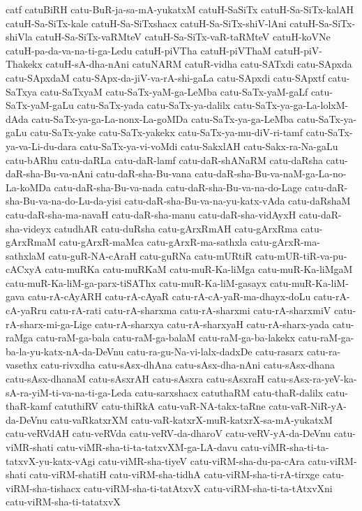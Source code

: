 {catf
catuBiRH
catu-BuR-ja-sa-mA-yukatxM
catuH-SaSiTx
catuH-Sa-SiTx-kalAH
catuH-Sa-SiTx-kale
catuH-Sa-SiTxshacx
catuH-Sa-SiTx-shiV-lAni
catuH-Sa-SiTx-shiVla
catuH-Sa-SiTx-vaRMteV
catuH-Sa-SiTx-vaR-taRMteV
catuH-koVNe
catuH-pa-da-va-na-ti-ga-Ledu
catuH-piVTha
catuH-piVThaM
catuH-piV-Thakekx
catuH-sA-dha-nAni
catuNARM
catuR-vidha
catu-SATxdi
catu-SApxda
catu-SApxdaM
catu-SApx-da-jiV-va-rA-shi-gaLa
catu-SApxdi
catu-SApxtf
catu-SaTxya
catu-SaTxyaM
catu-SaTx-yaM-ga-LeMba
catu-SaTx-yaM-gaLf
catu-SaTx-yaM-gaLu
catu-SaTx-yada
catu-SaTx-ya-dalilx
catu-SaTx-ya-ga-La-lolxM-dAda
catu-SaTx-ya-ga-La-nonx-La-goMDa
catu-SaTx-ya-ga-LeMba
catu-SaTx-ya-gaLu
catu-SaTx-yake
catu-SaTx-yakekx
catu-SaTx-ya-mu-diV-ri-tamf
catu-SaTx-ya-va-Li-du-dara
catu-SaTx-ya-vi-voMdi
catu-SakxlAH
catu-Sakx-ra-Na-gaLu
catu-bARhu
catu-daRLa
catu-daR-lamf
catu-daR-shANaRM
catu-daRsha
catu-daR-sha-Bu-va-nAni
catu-daR-sha-Bu-vana
catu-daR-sha-Bu-va-naM-ga-La-no-La-koMDa
catu-daR-sha-Bu-va-nada
catu-daR-sha-Bu-va-na-do-Lage
catu-daR-sha-Bu-va-na-do-Lu-da-yisi
catu-daR-sha-Bu-va-na-yu-katx-vAda
catu-daRshaM
catu-daR-sha-ma-navaH
catu-daR-sha-manu
catu-daR-sha-vidAyxH
catu-daR-sha-videyx
catudhAR
catu-duRsha
catu-gArxRmAH
catu-gArxRma
catu-gArxRmaM
catu-gArxR-maMca
catu-gArxR-ma-sathxla
catu-gArxR-ma-sathxlaM
catu-guR-NA-cAraH
catu-guRNa
catu-mURtiR
catu-mUR-tiR-va-pu-cACxyA
catu-muRKa
catu-muRKaM
catu-muR-Ka-liMga
catu-muR-Ka-liMgaM
catu-muR-Ka-liM-ga-parx-tiSAThx
catu-muR-Ka-liM-gasayx
catu-muR-Ka-liM-gava
catu-rA-cAyARH
catu-rA-cAyaR
catu-rA-cA-yaR-ma-dhayx-doLu
catu-rA-cA-yaRru
catu-rA-rati
catu-rA-sharxma
catu-rA-sharxmi
catu-rA-sharxmiV
catu-rA-sharx-mi-ga-Lige
catu-rA-sharxya
catu-rA-sharxyaH
catu-rA-sharx-yada
catu-raMga
catu-raM-ga-bala
catu-raM-ga-balaM
catu-raM-ga-ba-lakekx
catu-raM-ga-ba-la-yu-katx-nA-da-DeVnu
catu-ra-gu-Na-vi-lalx-dadxDe
catu-rasarx
catu-ra-vasethx
catu-rivxdha
catu-sAsx-dhAna
catu-sAsx-dha-nAni
catu-sAsx-dhana
catu-sAsx-dhanaM
catu-sAsxrAH
catu-sAsxra
catu-sAsxraH
catu-sAsx-ra-yeV-ka-sA-ra-yiM-ti-va-na-ti-ga-Leda
catu-sarxshacx
catuthaRM
catu-thaR-dalilx
catu-thaR-kamf
catuthiRV
catu-thiRkA
catu-vaR-NA-takx-taRne
catu-vaR-NiR-yA-da-DeVnu
catu-vaRkatxrXM
catu-vaR-katxrX-muR-katxrX-sa-mA-yukatxM
catu-veRVdAH
catu-veRVda
catu-veRV-da-dharoV
catu-veRV-yA-da-DeVnu
catu-viMR-shati
catu-viMR-sha-ti-ta-tatxvXM-ga-LA-davu
catu-viMR-sha-ti-ta-tatxvX-yu-katx-vAgi
catu-viMR-sha-tiyeV
catu-viRM-sha-du-pa-cAra
catu-viRM-shati
catu-viRM-shatiH
catu-viRM-sha-tidhA
catu-viRM-sha-ti-rA-tirxge
catu-viRM-sha-tishacx
catu-viRM-sha-ti-tatAtxvX
catu-viRM-sha-ti-ta-tAtxvXni
catu-viRM-sha-ti-tatatxvX
}
